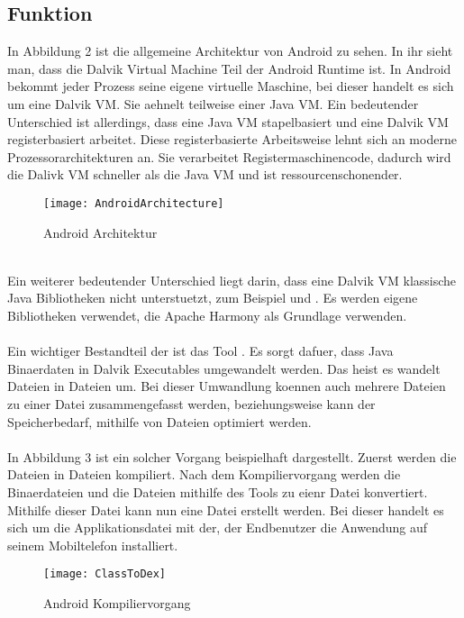 \documentclass[11pt,conference,a4paper]{IEEEtran}
\begin{document}
\subsection{Funktion}
In Abbildung 2 ist die allgemeine Architektur von Android zu sehen. In ihr sieht man, dass die Dalvik Virtual Machine Teil der Android Runtime ist. In Android bekommt jeder Prozess seine eigene virtuelle Maschine, bei dieser handelt es sich um eine Dalvik VM. Sie aehnelt teilweise einer Java VM. Ein bedeutender Unterschied ist allerdings, dass eine Java VM stapelbasiert und eine Dalvik VM registerbasiert arbeitet. Diese registerbasierte Arbeitsweise lehnt sich an moderne Prozessorarchitekturen an. Sie verarbeitet Registermaschinencode, dadurch wird die Dalivk VM schneller als die Java VM und ist ressourcenschonender.
\\
\begin{figure*}
\centering
\texttt{[image: AndroidArchitecture]}
\caption{Android Architektur\cite{1}}
\label{fig:AndroidArchitecture}
\end{figure*}
\\
Ein weiterer bedeutender Unterschied liegt darin, dass eine Dalvik VM klassische Java Bibliotheken nicht unterstuetzt, zum Beispiel  und . Es werden eigene Bibliotheken verwendet, die Apache Harmony als Grundlage verwenden.
\\
\\
Ein wichtiger Bestandteil der  ist das Tool . Es sorgt dafuer, dass Java Binaerdaten in Dalvik Executables umgewandelt werden. Das heist es wandelt  Dateien in  Dateien um. Bei dieser Umwandlung koennen auch mehrere  Dateien zu einer  Datei zusammengefasst werden, beziehungsweise kann der Speicherbedarf, mithilfe von  Dateien optimiert werden. 
\\
\\
In Abbildung 3 ist ein solcher Vorgang beispielhaft dargestellt. Zuerst werden die  Dateien in  Dateien kompiliert. Nach dem Kompiliervorgang werden die Binaerdateien und die  Dateien mithilfe des  Tools zu eienr  Datei konvertiert. Mithilfe dieser Datei kann nun eine  Datei erstellt werden. Bei dieser handelt es sich um die Applikationsdatei mit der, der Endbenutzer die Anwendung auf seinem Mobiltelefon installiert.

\begin{figure*}
\centering
\texttt{[image: ClassToDex]}
\caption{Android Kompiliervorgang\cite{7}}
\label{fig:ClassToDex}
\end{figure*}
\end{document}
